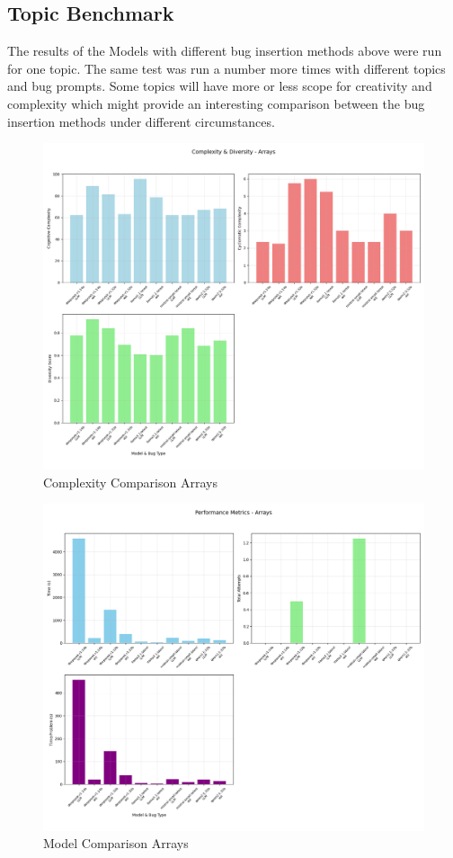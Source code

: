 \documentclass[12pt]{extarticle}
\begin{document}
\subsection{Topic Benchmark}

The results of the Models with different bug insertion methods above were run for one topic. The same test was run a number more times with different topics and bug prompts. Some topics will have more or less scope for creativity and complexity which might provide an interesting comparison between the bug insertion methods under different circumstances.

\begin{figure}[H]
\centering
\includegraphics[width=0.7\linewidth]{Images/Complexity_Comparison_Arrays.png}
\caption{Complexity Comparison Arrays}
\label{fig:Complexity_Comparison_Arrays}
\end{figure}
    

\begin{figure}[H]
\centering
\includegraphics[width=0.7\linewidth]{Images/Model_Comparison_Arrays.png}
\caption{Model Comparison Arrays}
\label{fig:Model_Comparison_Arrays}
\end{figure}
\end{document}
